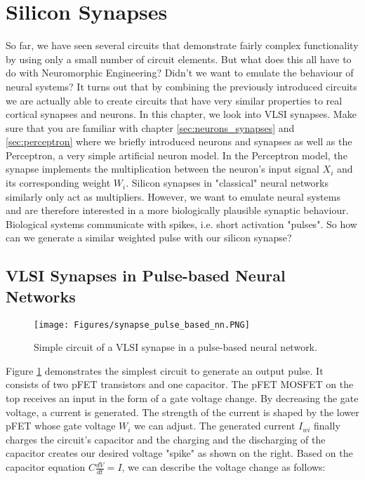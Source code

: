 \section{Silicon Synapses}

So far, we have seen several circuits that demonstrate fairly complex functionality by using only a small number of circuit elements. But what does this all have to do with Neuromorphic Engineering? Didn't we want to emulate the behaviour of neural systems? It turns out that by combining the previously introduced circuits we are actually able to create circuits that have very similar properties to real cortical synapses and neurons. In this chapter, we look into VLSI synapses. Make sure that you are familiar with chapter \ref{sec:neurons_synapses} and \ref{sec:perceptron} where we briefly introduced neurons and synapses as well as the Perceptron, a very simple artificial neuron model. In the Perceptron model, the synapse implements the multiplication between the neuron's input signal $X_i$ and its corresponding weight $W_i$. Silicon synapses in "classical" neural networks similarly only act as multipliers. However, we want to emulate neural systems and are therefore interested in a more biologically plausible synaptic behaviour. Biological systems communicate with spikes, i.e. short activation "pulses". So how can we generate a similar weighted pulse with our silicon synapse?

\subsection{VLSI Synapses in Pulse-based Neural Networks}

\begin{figure}
    \centering
    \texttt{[image: Figures/synapse\_pulse\_based\_nn.PNG]}
    \caption{Simple circuit of a VLSI synapse in a pulse-based neural network.}
    \label{fig:synapse_pulse_based}
\end{figure}

Figure \ref{fig:synapse_pulse_based} demonstrates the simplest circuit to generate an output pulse. It consists of two pFET transistors and one capacitor. The pFET MOSFET on the top receives an input in the form of a gate voltage change. By decreasing the gate voltage, a current is generated. The strength of the current is shaped by the lower pFET whose gate voltage $W_i$ we can adjust. The generated current $I_{wi}$ finally charges the circuit's capacitor and the charging and the discharging of the capacitor creates our desired voltage "spike" as shown on the right. Based on the capacitor equation $C\frac{dV}{dt} = I$, we can describe the voltage change as follows:

